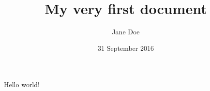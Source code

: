 \documentclass{article}
\title{My very first document}
\author{Jane Doe}
\date{31 September 2016}
\begin{document}
\maketitle
Hello world!
\end{document}
